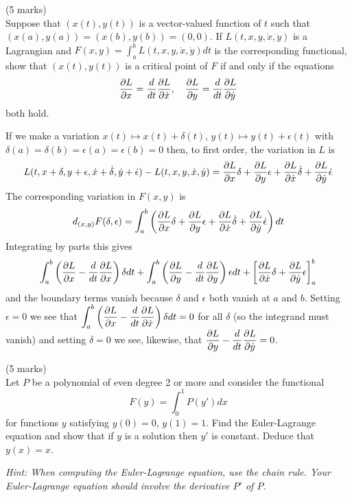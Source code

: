 \documentclass[12pt]{article}
\begin{document}
\newpage


\bigskip
\begin{question}(5 marks)\\
Suppose that $(x(t),y(t))$ is a vector-valued function of $t$ such that $(x(a),y(a))=(x(b),y(b))=(0,0)$. If $L(t,x,y,\dot{x},\dot{y})$ is a Lagrangian and $F(x,y)=\int_a^bL(t,x,y,\dot{x},\dot{y})dt$ is the corresponding functional, show that $(x(t),y(t))$ is a critical point of $F$ if and only if the equations
\[\dfrac{\partial L}{\partial x}=\dfrac{d }{d t}\dfrac{\partial L}{\partial \dot{x}},\quad\dfrac{\partial L}{\partial y}=\dfrac{d }{d t}\dfrac{\partial L}{\partial \dot{y}}\]
both hold.
\end{question}

\begin{answer}
If we make a variation $x(t)\mapsto x(t)+\delta(t)$, $y(t)\mapsto y(t)+\epsilon(t)$ with $\delta(a)=\delta(b)=\epsilon(a)=\epsilon(b)=0$ then, to first order, the variation in $L$ is
\[L(t,x+\delta,y+\epsilon,\dot{x}+\dot{\delta},\dot{y}+\dot{\epsilon})-L(t,x,y,\dot{x},\dot{y})=\dfrac{\partial L}{\partial x}\delta+\dfrac{\partial L}{\partial y}\epsilon+\dfrac{\partial L}{\partial \dot{x}}\dot{\delta}+\dfrac{\partial L}{\partial \dot{y}}\dot{\epsilon}\]
The corresponding variation in $F(x,y)$ is
\[d_{(x,y)}F(\delta,\epsilon)=\int_a^b\left(\dfrac{\partial L}{\partial x}\delta+\dfrac{\partial L}{\partial y}\epsilon+\dfrac{\partial L}{\partial \dot{x}}\dot{\delta}+\dfrac{\partial L}{\partial \dot{y}}\dot{\epsilon}\right)dt\]
Integrating by parts this gives
\[\int_a^b\left(\dfrac{\partial L}{\partial x}-\dfrac{d }{d t}\dfrac{\partial L}{\partial x}\right)\delta dt+\int_a^b\left(\dfrac{\partial L}{\partial y}-\dfrac{d }{d t}\dfrac{\partial L}{\partial y}\right)\epsilon dt+\left[\dfrac{\partial L}{\partial \dot{x}}\delta+\dfrac{\partial L}{\partial \dot{y}}\epsilon\right]_a^b\]
and the boundary terms vanish because $\delta$ and $\epsilon$ both vanish at $a$ and $b$. Setting $\epsilon=0$ we see that $\displaystyle\int_a^b\left(\dfrac{\partial L}{\partial x}-\dfrac{d }{d t}\dfrac{\partial L}{\partial \dot{x}}\right)\delta dt=0$ for all $\delta$ (so the integrand must vanish) and setting $\delta=0$ we see, likewise, that $\dfrac{\partial L}{\partial y}-\dfrac{d }{d t}\dfrac{\partial L}{\partial \dot{y}}=0$.
\end{answer}
\newpage
\bigskip


\begin{question}(5 marks)\\
Let $P$ be a polynomial of even degree 2 or more and consider the functional
\[F(y)=\int_0^1P(y')dx\]
for functions $y$ satisfying $y(0)=0$, $y(1)=1$. Find the Euler-Lagrange equation and show that if $y$ is a solution then $y'$ is constant. Deduce that $y(x)=x$.

{\em Hint: When computing the Euler-Lagrange equation, use the chain rule. Your Euler-Lagrange equation should involve the derivative $P'$ of $P$.}
\end{question}
\end{document}
